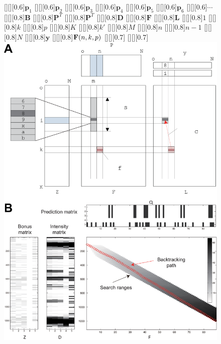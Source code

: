 \begin{figure}
\centering
	[][][0.6]{$\mathbf{p}_1$}
	[][][0.6]{$\mathbf{p}_2$}
	[][][0.6]{$\mathbf{p}_3$}
	[][][0.6]{$\mathbf{p}_4$}
	[][][0.6]{$\mathbf{p}_5$}
	[][][0.6]{$\mathbf{p}_6$}				
	[][][0.6]{$\cdots$}				
	[][][0.8]{$\mathbf{B}$}
	[][][0.8]{$\mathbf{P}^T$}
	[][][0.8]{$\mathbf{P}^T$}
	[][][0.8]{$\mathbf{D}$}
	[][][0.8]{$\mathbf{F}$}
	[][][0.8]{$\mathbf{L}$}
	[][][0.8]{$1$}
	[][][0.8]{$k$}
	[][][0.8]{$p$}
	[][][0.8]{$K$}
	[][][0.8]{$k'$}
	[][][0.8]{$M$}
	[][][0.8]{$n$}
	[][][0.8]{$n-1$}
	[][][0.8]{$N$}
	[][][0.8]{$\mathbf{y}$}
	[][][0.8]{${\mathbf{F}}(n,k,p)$}
	[][][0.7]{}
	[][][0.7]{}
\includegraphics[width=0.85\linewidth]{figures/method_dp_formulation}

\end{figure}
